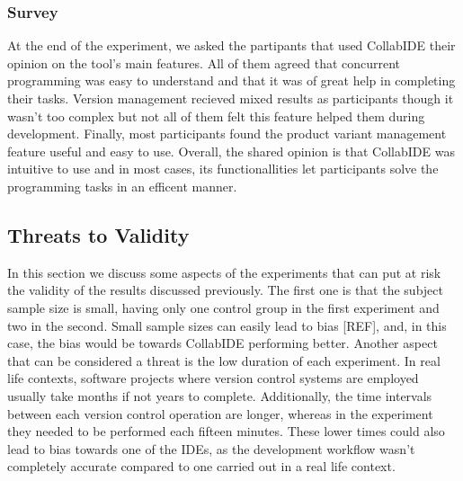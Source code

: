 \subsubsection{Survey}
At the end of the experiment, we asked the partipants that used CollabIDE their opinion on the tool's main features. All of them agreed that concurrent programming was easy to understand and that it was of great help in completing their tasks. Version management recieved mixed results as participants though it wasn't too complex but not all of them felt this feature helped them during development. Finally, most participants found the product variant management feature useful and easy to use. Overall, the shared opinion is that CollabIDE was intuitive to use and in most cases, its functionallities let participants solve the programming tasks in an efficent manner. 

\subsection{Threats to Validity}
In this section we discuss some aspects of the experiments that can put at risk the validity of the results discussed previously. The first one is that the subject sample size is small, having only one control group in the first experiment and two in the second. Small sample sizes can easily lead to bias [REF], and, in this case, the bias would be towards CollabIDE performing better. Another aspect that can be considered a threat is the low duration of each experiment. In real life contexts, software projects where version control systems are employed usually take months if not years to complete. Additionally, the time intervals between each version control operation are longer, whereas in the experiment they needed to be performed each fifteen minutes. These lower times could also lead to bias towards one of the IDEs, as the development workflow wasn't completely accurate compared to one carried out in a real life context. 


\endinput
